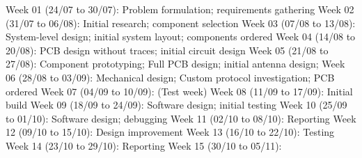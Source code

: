 Week 01 (24/07 to 30/07): Problem formulation; requirements gathering
Week 02 (31/07 to 06/08): Initial research; component selection
Week 03 (07/08 to 13/08): System-level design; initial system layout; components ordered
Week 04 (14/08 to 20/08): PCB design without traces; initial circuit design
Week 05 (21/08 to 27/08): Component prototyping; Full PCB design; initial antenna design;
Week 06 (28/08 to 03/09): Mechanical design; Custom protocol investigation; PCB ordered
Week 07 (04/09 to 10/09): (Test week)
Week 08 (11/09 to 17/09): Initial build
Week 09 (18/09 to 24/09): Software design; initial testing
Week 10 (25/09 to 01/10): Software design; debugging
Week 11 (02/10 to 08/10): Reporting
Week 12 (09/10 to 15/10): Design improvement
Week 13 (16/10 to 22/10): Testing
Week 14 (23/10 to 29/10): Reporting
Week 15 (30/10 to 05/11):
